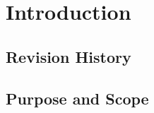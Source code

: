 \documentclass[11pt,a4paper]{report}
\begin{document}


\thispagestyle{empty}
\tableofcontents
\listoffigures
\cleardoublepage
{}
\pagestyle{fancy}

\chapter{Introduction}
\section{Revision History}
\section{Purpose and Scope}
\end{document}
